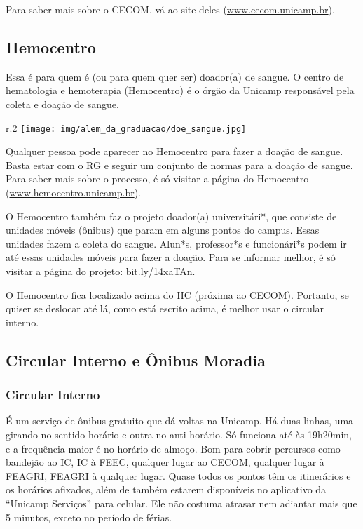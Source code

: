 Para saber mais sobre o CECOM, vá ao site deles (\url{www.cecom.unicamp.br}).

\subsection{Hemocentro}

Essa é para quem é (ou para quem quer ser) doador(a) de sangue. O centro de
hematologia e hemoterapia (Hemocentro) é o órgão da Unicamp responsável pela
coleta e doação de sangue.
\begin{wrapfigure}{r}{.2\textwidth}
    \centering
    \texttt{[image: img/alem\_da\_graduacao/doe\_sangue.jpg]}
\end{wrapfigure}
Qualquer pessoa pode aparecer no Hemocentro para fazer a doação de sangue.
Basta estar com o RG e seguir um conjunto de normas para a doação de sangue.
Para saber mais sobre o processo, é só visitar a página do Hemocentro
(\url{www.hemocentro.unicamp.br}).

O Hemocentro também faz o projeto doador(a) universitári*, que consiste de
unidades móveis (ônibus) que param em alguns pontos do campus. Essas unidades
fazem a coleta do sangue. Alun*s, professor*s e funcionári*s podem ir até essas
unidades móveis para fazer a doação. Para se informar melhor, é só visitar a
página do projeto: \url{bit.ly/14xaTAn}.

O Hemocentro fica localizado acima do HC (próxima ao CECOM). Portanto, se
quiser se deslocar até lá, como está escrito acima, é melhor usar o circular
interno.

\subsection{Circular Interno e Ônibus Moradia}

\subsubsection{Circular Interno}
É um serviço de ônibus gratuito que dá voltas na Unicamp. Há duas linhas, uma
girando no sentido horário e outra no anti-horário.  Só funciona até às
19h20min, e a frequência maior é no horário de almoço. Bom para cobrir
percursos como bandejão ao IC, IC à FEEC, qualquer lugar ao CECOM, qualquer
lugar à FEAGRI, FEAGRI à qualquer lugar. Quase todos os pontos têm os
itinerários e os horários afixados, além de também estarem disponíveis no
aplicativo da ``Unicamp Serviços'' para celular. Ele não costuma atrasar nem
adiantar mais que 5 minutos, exceto no período de férias.

